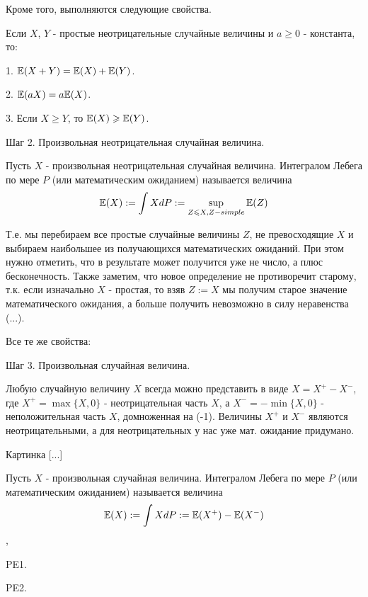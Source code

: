 {Кроме того, выполняются следующие свойства.

Если $X$, $Y$ - простые неотрицательные случайные величины и $a\geq 0$ - константа, то:

1. $\mathbb{E}(X+Y)=\mathbb{E}(X)+\mathbb{E}(Y)$.

2. $\mathbb{E}(aX)=a\mathbb{E}(X)$.

3. Если $X\geq Y$, то $\mathbb{E}(X)\geqslant \mathbb{E}(Y)$.


Шаг 2. Произвольная неотрицательная случайная величина.

\begin{mydef}
Пусть $X$ - произвольная неотрицательная случайная величина. Интегралом Лебега по мере $P$ (или математическим ожиданием) называется величина
\begin{equation}
\mathbb{E}(X):=\int X dP:=\sup_{Z\leqslant X, Z-simple}  \mathbb{E}(Z)
\end{equation}
\end{mydef}

Т.е. мы перебираем все простые случайные величины $Z$, не превосходящие $X$ и выбираем наибольшее из получающихся математических ожиданий. При этом нужно отметить, что в результате может получится уже не число, а плюс бесконечность. Также заметим, что новое определение не противоречит старому, т.к. если изначально $X$ - простая, то взяв $Z:=X$ мы получим старое значение математического ожидания, а больше получить невозможно в силу неравенства (...).


Все те же свойства:


Шаг 3. Произвольная случайная величина.

Любую случайную величину $X$ всегда можно представить в виде $X=X^{+}-X^{-}$, где $X^{+}=\max\{X,0\}$ - неотрицательная часть $X$, а $X^{-}=-\min\{X,0\}$ - неположительная часть $X$, домноженная на (-1). Величины $X^{+}$ и $X^{-}$ являются неотрицательными, а для неотрицательных у нас уже мат. ожидание придумано.

Картинка [...]

\begin{mydef}
Пусть $X$ - произвольная случайная величина. Интегралом Лебега по мере $P$ (или математическим ожиданием) называется величина
\begin{equation}
\mathbb{E}(X):=\int X dP:=\mathbb{E}(X^{+})-\mathbb{E}(X^{-})
\end{equation},

\end{mydef}




PE1.

PE2.


}
